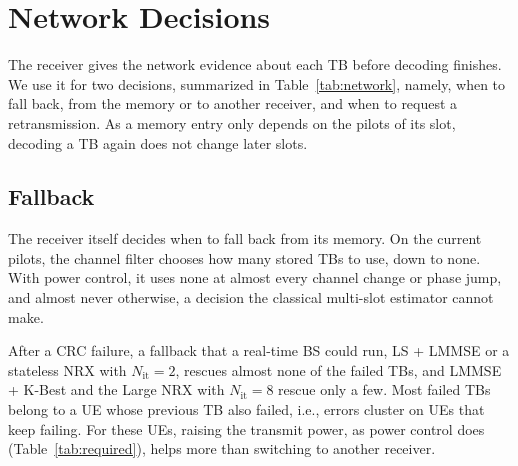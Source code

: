 \section{Network Decisions}
The receiver gives the network evidence about each TB before decoding finishes. We use it for two decisions, summarized in Table~\ref{tab:network}, namely, when to fall back, from the memory or to another receiver, and when to request a retransmission. As a memory entry only depends on the pilots of its slot, decoding a TB again does not change later slots.

\begin{table}[t]
\centering
\caption{Network decisions with 16-QAM over the three conditions, without (No PC) and with power control (PC); early retransmission and HARQ with power control. Stateless NRX: Large NRX retrained with $N_{\mathrm{it}}=2$.}
\label{tab:network}
\scriptsize\setlength{\tabcolsep}{3.5pt}

\end{table}

\subsection{Fallback}
The receiver itself decides when to fall back from its memory. On the current pilots, the channel filter chooses how many stored TBs to use, down to none. With power control, it uses none at almost every channel change or phase jump, and almost never otherwise, a decision the classical multi-slot estimator cannot make.

After a CRC failure, a fallback that a real-time BS could run, LS + LMMSE or a stateless NRX with $N_{\mathrm{it}}=2$, rescues almost none of the failed TBs, and LMMSE + K-Best and the Large NRX with $N_{\mathrm{it}}=8$ rescue only a few. Most failed TBs belong to a UE whose previous TB also failed, i.e., errors cluster on UEs that keep failing. For these UEs, raising the transmit power, as power control does (Table~\ref{tab:required}), helps more than switching to another receiver.

